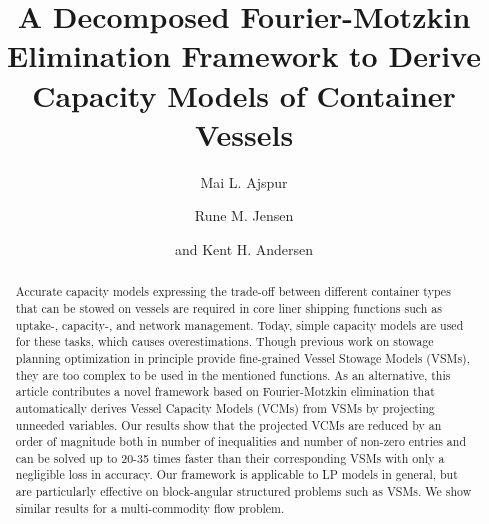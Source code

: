 \documentclass[citeauthoryear]{llncs}
\begin{document}
\title{A Decomposed Fourier-Motzkin Elimination Framework to Derive Capacity Models of Container Vessels}
\author{Mai L. Ajspur \and Rune M. Jensen \and and Kent H. Andersen}

\maketitle

\begin{abstract}
Accurate capacity models expressing the trade-off between different container types that can be stowed
on vessels are required in core liner shipping functions such as uptake-, capacity-, and network management.
Today, simple capacity models are used for these tasks, which causes overestimations. 
Though previous work on stowage planning optimization in principle provide fine-grained Vessel Stowage Models (VSMs), they are too complex to be used in the mentioned functions. 
As an alternative, this article contributes a novel framework based on Fourier-Motzkin
elimination that automatically derives Vessel Capacity Models (VCMs) from VSMs by projecting unneeded
variables. Our results show that the projected VCMs are reduced by an order of magnitude both in number of
inequalities and number of non-zero entries and can be solved up to 20-35 times faster than their corresponding VSMs with only a negligible loss in accuracy. 
Our framework is applicable to LP models in general, but are particularly effective on block-angular structured problems such as VSMs. We show similar results for a multi-commodity flow problem.
\end{abstract}
\end{document}

